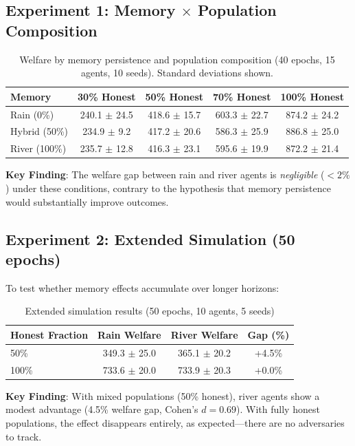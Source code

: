 \documentclass{article}
\begin{document}
\subsection{Experiment 1: Memory $\times$ Population Composition}

\begin{table}[h]
\centering
\begin{tabular}{lcccc}
\toprule
Memory & 30\% Honest & 50\% Honest & 70\% Honest & 100\% Honest \\
\midrule
Rain (0\%) & 240.1 $\pm$ 24.5 & 418.6 $\pm$ 15.7 & 603.3 $\pm$ 22.7 & 874.2 $\pm$ 24.2 \\
Hybrid (50\%) & 234.9 $\pm$ 9.2 & 417.2 $\pm$ 20.6 & 586.3 $\pm$ 25.9 & 886.8 $\pm$ 25.0 \\
River (100\%) & 235.7 $\pm$ 12.8 & 416.3 $\pm$ 23.1 & 595.6 $\pm$ 19.9 & 872.2 $\pm$ 21.4 \\
\bottomrule
\end{tabular}
\caption{Welfare by memory persistence and population composition (40 epochs, 15 agents, 10 seeds). Standard deviations shown.}
\end{table}

\textbf{Key Finding}: The welfare gap between rain and river agents is \textit{negligible} ($<2\%$) under these conditions, contrary to the hypothesis that memory persistence would substantially improve outcomes.

\subsection{Experiment 2: Extended Simulation (50 epochs)}

To test whether memory effects accumulate over longer horizons:

\begin{table}[h]
\centering
\begin{tabular}{lccc}
\toprule
Honest Fraction & Rain Welfare & River Welfare & Gap (\%) \\
\midrule
50\% & 349.3 $\pm$ 25.0 & 365.1 $\pm$ 20.2 & +4.5\% \\
100\% & 733.6 $\pm$ 20.0 & 733.9 $\pm$ 20.3 & +0.0\% \\
\bottomrule
\end{tabular}
\caption{Extended simulation results (50 epochs, 10 agents, 5 seeds)}
\end{table}

\textbf{Key Finding}: With mixed populations (50\% honest), river agents show a modest advantage (4.5\% welfare gap, Cohen's $d = 0.69$). With fully honest populations, the effect disappears entirely, as expected---there are no adversaries to track.
\end{document}
